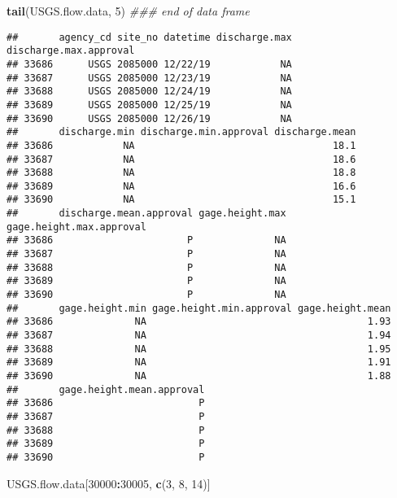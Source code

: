 \documentclass[]{article}
\newenvironment{Shaded}{\begin{snugshade}}{\end{snugshade}}
\newcommand{\CommentTok}[1]{\textcolor[rgb]{0.56,0.35,0.01}{\textit{#1}}}
\newcommand{\DecValTok}[1]{\textcolor[rgb]{0.00,0.00,0.81}{#1}}
\newcommand{\KeywordTok}[1]{\textcolor[rgb]{0.13,0.29,0.53}{\textbf{#1}}}
\newcommand{\NormalTok}[1]{#1}
\newcommand{\OperatorTok}[1]{\textcolor[rgb]{0.81,0.36,0.00}{\textbf{#1}}}
\begin{document}
\begin{Shaded}
\begin{Highlighting}[]
\KeywordTok{tail}\NormalTok{(USGS.flow.data, }\DecValTok{5}\NormalTok{) }\CommentTok{### end of data frame }
\end{Highlighting}
\end{Shaded}

\begin{verbatim}
##       agency_cd site_no datetime discharge.max discharge.max.approval
## 33686      USGS 2085000 12/22/19            NA                       
## 33687      USGS 2085000 12/23/19            NA                       
## 33688      USGS 2085000 12/24/19            NA                       
## 33689      USGS 2085000 12/25/19            NA                       
## 33690      USGS 2085000 12/26/19            NA                       
##       discharge.min discharge.min.approval discharge.mean
## 33686            NA                                  18.1
## 33687            NA                                  18.6
## 33688            NA                                  18.8
## 33689            NA                                  16.6
## 33690            NA                                  15.1
##       discharge.mean.approval gage.height.max gage.height.max.approval
## 33686                       P              NA                         
## 33687                       P              NA                         
## 33688                       P              NA                         
## 33689                       P              NA                         
## 33690                       P              NA                         
##       gage.height.min gage.height.min.approval gage.height.mean
## 33686              NA                                      1.93
## 33687              NA                                      1.94
## 33688              NA                                      1.95
## 33689              NA                                      1.91
## 33690              NA                                      1.88
##       gage.height.mean.approval
## 33686                         P
## 33687                         P
## 33688                         P
## 33689                         P
## 33690                         P
\end{verbatim}

\begin{Shaded}
\begin{Highlighting}[]
\NormalTok{USGS.flow.data[}\DecValTok{30000}\OperatorTok{:}\DecValTok{30005}\NormalTok{, }\KeywordTok{c}\NormalTok{(}\DecValTok{3}\NormalTok{, }\DecValTok{8}\NormalTok{, }\DecValTok{14}\NormalTok{)]}
\end{Highlighting}
\end{Shaded}
\end{document}
